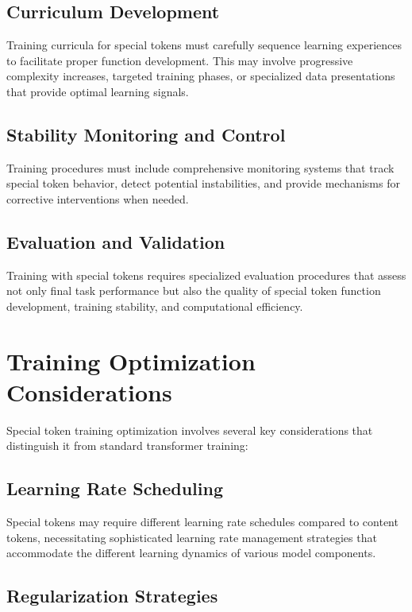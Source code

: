 \subsection{Curriculum Development}

Training curricula for special tokens must carefully sequence learning experiences to facilitate proper function development. This may involve progressive complexity increases, targeted training phases, or specialized data presentations that provide optimal learning signals.

\subsection{Stability Monitoring and Control}

Training procedures must include comprehensive monitoring systems that track special token behavior, detect potential instabilities, and provide mechanisms for corrective interventions when needed.

\subsection{Evaluation and Validation}

Training with special tokens requires specialized evaluation procedures that assess not only final task performance but also the quality of special token function development, training stability, and computational efficiency.

\section{Training Optimization Considerations}

Special token training optimization involves several key considerations that distinguish it from standard transformer training:

\subsection{Learning Rate Scheduling}

Special tokens may require different learning rate schedules compared to content tokens, necessitating sophisticated learning rate management strategies that accommodate the different learning dynamics of various model components.

\subsection{Regularization Strategies}

